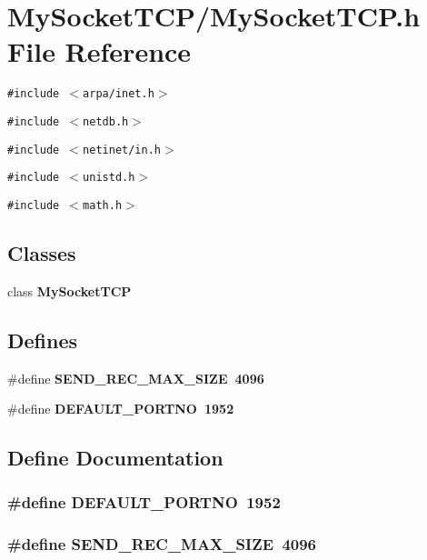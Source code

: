 \section{My\-Socket\-TCP/My\-Socket\-TCP.h File Reference}
\label{MySocketTCP_8h}
{\tt \#include $<$arpa/inet.h$>$}\par
{\tt \#include $<$netdb.h$>$}\par
{\tt \#include $<$netinet/in.h$>$}\par
{\tt \#include $<$unistd.h$>$}\par
{\tt \#include $<$math.h$>$}\par
\subsection*{Classes}
\begin{CompactItemize}
\item 
class \bf{My\-Socket\-TCP}
\end{CompactItemize}
\subsection*{Defines}
\begin{CompactItemize}
\item 
\#define \bf{SEND\_\-REC\_\-MAX\_\-SIZE}~4096
\item 
\#define \bf{DEFAULT\_\-PORTNO}~1952
\end{CompactItemize}


\subsection{Define Documentation}
\subsubsection{\setlength{\rightskip}{0pt plus 5cm}\#define DEFAULT\_\-PORTNO~1952}\label{MySocketTCP_8h_50b86f9de42a975581ff978f42ff426d}


\subsubsection{\setlength{\rightskip}{0pt plus 5cm}\#define SEND\_\-REC\_\-MAX\_\-SIZE~4096}\label{MySocketTCP_8h_bb1295578cf74e08a721feb53b401551}


